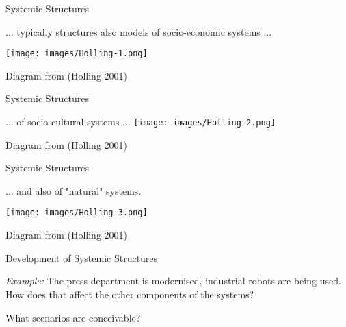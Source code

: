 \documentclass{beamer}
\begin{document}
\begin{frame}{Systemic Structures}

  ... typically structures also models of socio-economic systems ...
  \begin{center}
    \texttt{[image: images/Holling-1.png]}

    Diagram from (Holling 2001)
  \end{center}
\end{frame}

\begin{frame}{Systemic Structures}
  \begin{center}

    ... of socio-cultural systems ... 
    \texttt{[image: images/Holling-2.png]}

    Diagram from (Holling 2001)
  \end{center}
\end{frame}

\begin{frame}{Systemic Structures}

  ... and also of "natural" systems.
  \begin{center}
    \texttt{[image: images/Holling-3.png]}

    Diagram from (Holling 2001)
  \end{center}
\end{frame}

\begin{frame}{Development of Systemic Structures}

  \emph{Example:} The press department is modernised, industrial robots are
  being used.  How does that affect the other components of the systems?

  What scenarios are conceivable?

\end{frame}
\end{document}
